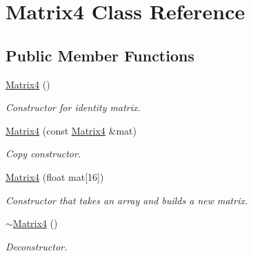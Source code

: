 \hypertarget{class_matrix4}{}\section{Matrix4 Class Reference}
\label{class_matrix4}
\subsection*{Public Member Functions}
\begin{DoxyCompactItemize}
\item 
\mbox{\label{class_matrix4_a21e70a74447b9b05cf9a06400bc9c661}} 
\mbox{\hyperlink{class_matrix4_a21e70a74447b9b05cf9a06400bc9c661}{Matrix4}} ()
\begin{DoxyCompactList}\small\item\em Constructor for identity matrix. \end{DoxyCompactList}\item 
\mbox{\label{class_matrix4_ab6bebf1e26ad75e79d4d57942de9a0c2}} 
\mbox{\hyperlink{class_matrix4_ab6bebf1e26ad75e79d4d57942de9a0c2}{Matrix4}} (const \mbox{\hyperlink{class_matrix4}{Matrix4}} \&mat)
\begin{DoxyCompactList}\small\item\em Copy constructor. \end{DoxyCompactList}\item 
\mbox{\label{class_matrix4_a617298ade1d407310876e78183e47c87}} 
\mbox{\hyperlink{class_matrix4_a617298ade1d407310876e78183e47c87}{Matrix4}} (float mat\mbox{[}16\mbox{]})
\begin{DoxyCompactList}\small\item\em Constructor that takes an array and builds a new matrix. \end{DoxyCompactList}\item 
\mbox{\label{class_matrix4_ae0087573c29359c66423bee7b815ce42}} 
\mbox{\hyperlink{class_matrix4_ae0087573c29359c66423bee7b815ce42}{$\sim$\+Matrix4}} ()
\begin{DoxyCompactList}\small\item\em Deconstructor. \end{DoxyCompactList}\item 
\mbox{\label{class_matrix4_a6ff99e9b78c07a013f82e1cd38d45eef}} 

\end{DoxyCompactItemize}
